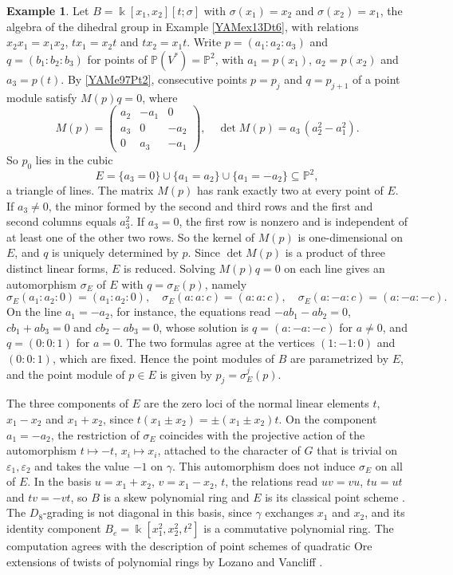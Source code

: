 \documentclass[reqno]{amsart}
\numberwithin{equation}{section}
\theoremstyle{definition}
\newtheorem{example}[equation]{Example}
\theoremstyle{remark}
\theoremstyle{plain}
\newcommand{\kk}{\Bbbk}
\begin{document}
\begin{example}\label{YAMex21Pt5}
Let $B=\kk[x_1,x_2][t;\sigma]$ with $\sigma(x_1)=x_2$ and $\sigma(x_2)=x_1$, the algebra of the dihedral group in Example \ref{YAMex13Dt6}, with relations $x_2x_1=x_1x_2$, $tx_1=x_2t$ and $tx_2=x_1t$. Write $p=(a_1:a_2:a_3)$ and $q=(b_1:b_2:b_3)$ for points of $\mathbb P(V^*)=\mathbb P^2$, with $a_1=p(x_1)$, $a_2=p(x_2)$ and $a_3=p(t)$. By \eqref{YAMe97Pt2}, consecutive points $p=p_j$ and $q=p_{j+1}$ of a point module satisfy $M(p)q=0$, where
\[
M(p)=\begin{pmatrix}a_2&-a_1&0\\a_3&0&-a_2\\0&a_3&-a_1\end{pmatrix},\quad\det M(p)=a_3\,(a_2^2-a_1^2).
\]
So $p_0$ lies in the cubic
\[
E=\{a_3=0\}\cup\{a_1=a_2\}\cup\{a_1=-a_2\}\subseteq\mathbb P^2,
\]
a triangle of lines. The matrix $M(p)$ has rank exactly two at every point of $E$. If $a_3\neq0$, the minor formed by the second and third rows and the first and second columns equals $a_3^2$. If $a_3=0$, the first row is nonzero and is independent of at least one of the other two rows. So the kernel of $M(p)$ is one-dimensional on $E$, and $q$ is uniquely determined by $p$. Since $\det M(p)$ is a product of three distinct linear forms, $E$ is reduced. Solving $M(p)q=0$ on each line gives an automorphism $\sigma_E$ of $E$ with $q=\sigma_E(p)$, namely
\[
\sigma_E(a_1:a_2:0)=(a_1:a_2:0),\quad\sigma_E(a:a:c)=(a:a:c),\quad\sigma_E(a:-a:c)=(a:-a:-c).
\]
On the line $a_1=-a_2$, for instance, the equations read $-ab_1-ab_2=0$, $cb_1+ab_3=0$ and $cb_2-ab_3=0$, whose solution is $q=(a:-a:-c)$ for $a\neq0$, and $q=(0:0:1)$ for $a=0$. The two formulas agree at the vertices $(1:-1:0)$ and $(0:0:1)$, which are fixed. Hence the point modules of $B$ are parametrized by $E$, and the point module of $p\in E$ is given by $p_j=\sigma_E^j(p)$.

The three components of $E$ are the zero loci of the normal linear elements $t$, $x_1-x_2$ and $x_1+x_2$, since $t(x_1\pm x_2)=\pm(x_1\pm x_2)t$. On the component $a_1=-a_2$, the restriction of $\sigma_E$ coincides with the projective action of the automorphism $t\mapsto-t$, $x_i\mapsto x_i$, attached to the character of $G$ that is trivial on $\varepsilon_1,\varepsilon_2$ and takes the value $-1$ on $\gamma$. This automorphism does not induce $\sigma_E$ on all of $E$. In the basis $u=x_1+x_2$, $v=x_1-x_2$, $t$, the relations read $uv=vu$, $tu=ut$ and $tv=-vt$, so $B$ is a skew polynomial ring and $E$ is its classical point scheme \cite{ATV}. The $D_8$-grading is not diagonal in this basis, since $\gamma$ exchanges $x_1$ and $x_2$, and its identity component $B_e=\kk[x_1^2,x_2^2,t^2]$ is a commutative polynomial ring. The computation agrees with the description of point schemes of quadratic Ore extensions of twists of polynomial rings by Lozano and Vancliff \cite{LoVa}.
\end{example}
\end{document}
